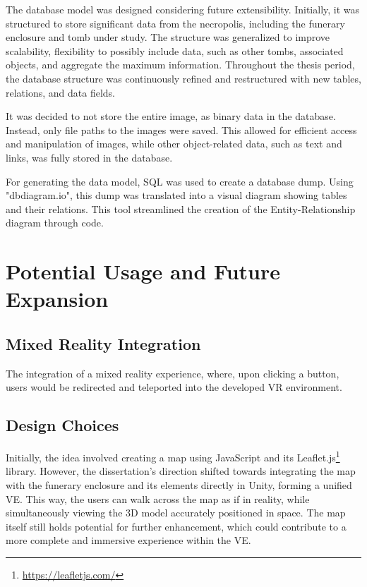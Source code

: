 The database model was designed considering future extensibility. Initially, it was structured to store significant data from the necropolis, including the funerary enclosure and tomb under study. The structure was generalized to improve scalability, flexibility to possibly include data, such as other tombs, associated objects, and aggregate the maximum information. 
Throughout the thesis period, the database structure was continuously refined and restructured with new tables, relations, and data fields.

It was decided to not store the entire image, as binary data in the database. Instead, only file paths to the images were saved. This allowed for efficient access and manipulation of images, while other object-related data, such as text and links, was fully stored in the database.

For generating the data model, SQL was used to create a database dump.
Using "dbdiagram.io", this dump was translated into a visual diagram showing tables and their relations. This tool streamlined the creation of the Entity-Relationship diagram through code.


\section{Potential Usage and Future Expansion}

\subsection{Mixed Reality Integration}
The integration of a mixed reality experience, where, upon clicking a button, users would be redirected and teleported into the developed \gls{VR} environment. 

\subsection{Design Choices}
Initially, the idea involved creating a map using JavaScript and its Leaflet.js\footnote{\url{https://leafletjs.com/}} library. 
However, the dissertation's direction shifted towards integrating the map with the funerary enclosure and its elements directly in Unity, forming a unified \gls{VE}. This way, the users can walk across the map as if in reality, while simultaneously viewing the \gls{3D} model accurately positioned in space. 
The map itself still holds potential for further enhancement, which could contribute to a more complete and immersive experience within the \gls{VE}.

